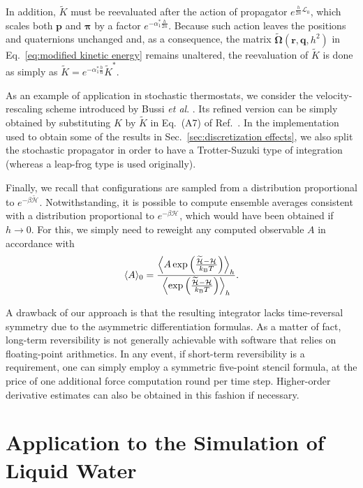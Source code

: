\documentclass[
	aip,
	jcp,
	reprint,
]{revtex4-1}
\newcommand{\vt}[1]{\boldsymbol{\mathbf{#1}}}          %
\newcommand{\Ham}[1]{{\mathcal H}_\text{#1}}           %
\newcommand{\timestep}{h}
\newcommand{\refined}[1]{\widetilde{#1}}
\newcommand{\mini}[1]{\text{\tiny{#1}}}
\begin{document}
In addition, $\refined K$ must be reevaluated after the action of propagator $e^{\frac{\timestep}{2n} {\mathcal L}_0}$, which scales both $\vt p$ and $\vt \pi$ by a factor $e^{-\alpha_1^\ast \frac{\timestep}{2n}}$.
Because such action leaves the positions and quaternions unchanged and, as a consequence, the matrix $\refined{\mathbf \Omega}(\vt r, \vt q, \timestep^2)$ in Eq.~\eqref{eq:modified kinetic energy} remains unaltered, the reevaluation of $\refined K$ is done as simply as ${\refined K} = e^{-\alpha_1^\ast \frac{\timestep}{n}} {\refined K}^\ast$.

As an example of application in stochastic thermostats, we consider the  velocity-rescaling scheme introduced by Bussi \textit{et al}. \cite{Bussi_2007}.
Its refined version can be simply obtained by substituting $K$ by $\refined{K}$ in Eq.~(A7) of Ref.~.
In the implementation used to obtain some of the results in Sec.~\ref{sec:discretization effects}, we also split the stochastic propagator in order to have a Trotter-Suzuki type of integration (whereas a leap-frog type is used originally).

Finally, we recall that configurations are sampled from a distribution proportional to $e^{-\beta \refined{\Ham{}}}$.
Notwithstanding, it is possible to compute ensemble averages consistent with a distribution proportional to $e^{-\beta \Ham{}}$, which would have been obtained if $\timestep \to 0$.
For this, we simply need to reweight any computed observable $A$ in accordance with \cite{Torrie_1977}
\begin{equation}
\label{eq:reweighting}
\langle A \rangle_0 = \frac{\left\langle A \exp \left({\frac{\refined{\Ham{}} - \Ham{}}{k_\mini{B} T}}\right)\right\rangle_\timestep}{\left\langle \exp \left({\frac{\refined{\Ham{}} - \Ham{}}{k_\mini{B} T}}\right)\right\rangle_\timestep}.
\end{equation}

A drawback of our approach is that the resulting integrator lacks time-reversal symmetry due to the asymmetric differentiation formulas.
As a matter of fact, long-term reversibility is not generally achievable with software that relies on floating-point arithmetics.
In any event, if short-term reversibility is a requirement, one can simply employ a symmetric five-point stencil formula, at the price of one additional force computation round per time step.
Higher-order derivative estimates can also be obtained in this fashion if necessary.

\section{Application to the Simulation of Liquid Water}
\label{sec:numerical_results}
\end{document}
